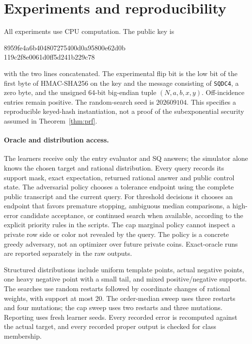 \section{Experiments and reproducibility}\label{app:experiments}
All experiments use CPU computation. The public key is
\begin{center}\small\ttfamily
8959fe4a6b404807275400d0a95800e62d0b\\
119c2f8e0061d0ff5d241b229c78
\end{center}
with the two lines concatenated. The experimental flip bit is the low bit of the first byte of HMAC-SHA256 on the key and the message consisting of \texttt{SQDC4}, a zero byte, and the unsigned 64-bit big-endian tuple $(N,a,b,x,y)$. Off-incidence entries remain positive. The random-search seed is $202609104$. This specifies a reproducible keyed-hash instantiation, not a proof of the subexponential security assumed in Theorem~\ref{thm:prf}.

\paragraph{Oracle and distribution access.}
The learners receive only the entry evaluator and SQ answers; the simulator alone knows the chosen target and rational distribution. Every query records its support mask, exact expectation, returned rational answer and public control state. The adversarial policy chooses a tolerance endpoint using the complete public transcript and the current query. For threshold decisions it chooses an endpoint that favors premature stopping, ambiguous median comparisons, a high-error candidate acceptance, or continued search when available, according to the explicit priority rules in the scripts. The cap marginal policy cannot inspect a private row side or color not revealed by the query. The policy is a concrete greedy adversary, not an optimizer over future private coins. Exact-oracle runs are reported separately in the raw outputs.

Structured distributions include uniform template points, actual negative points, one heavy negative point with a small tail, and mixed positive/negative supports. The searches use random restarts followed by coordinate changes of rational weights, with support at most 20. The order-median sweep uses three restarts and four mutations; the cap sweep uses two restarts and three mutations. Reporting uses fresh learner seeds. Every recorded error is recomputed against the actual target, and every recorded proper output is checked for class membership.

